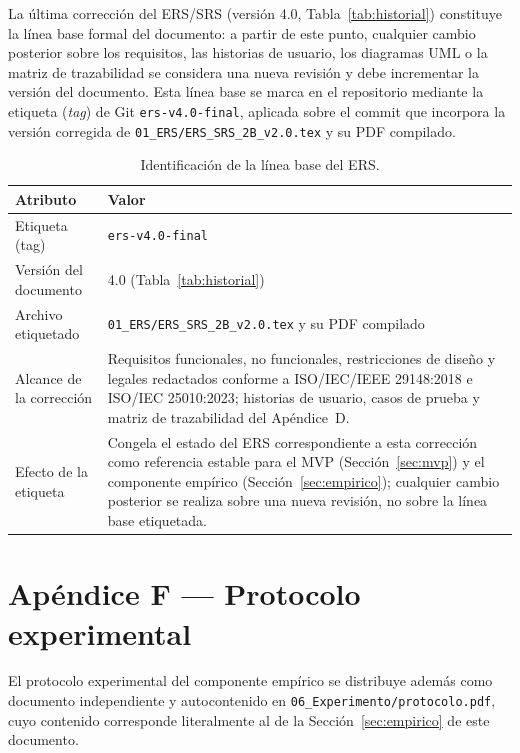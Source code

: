 \documentclass[journal,onecolumn]{IEEEtran}
\begin{document}
	La última corrección del ERS/SRS (versión 4.0, Tabla~\ref{tab:historial})
	constituye la línea base formal del documento: a partir de este punto,
	cualquier cambio posterior sobre los requisitos, las historias de usuario,
	los diagramas UML o la matriz de trazabilidad se considera una nueva
	revisión y debe incrementar la versión del documento. Esta línea base se
	marca en el repositorio mediante la etiqueta (\emph{tag}) de Git
	\texttt{ers-v4.0-final}, aplicada sobre el commit que incorpora la versión
	corregida de \texttt{01\_ERS/ERS\_SRS\_2B\_v2.0.tex} y su PDF compilado.

	\begin{table}[H]
		\centering
		\caption{Identificación de la línea base del ERS.}
		\label{tab:linea-base-ers}
		\small
		\begin{tabularx}{\textwidth}{@{}p{4cm} X@{}}
			\toprule
			\textbf{Atributo} & \textbf{Valor} \\
			\midrule
			Etiqueta (tag) & \texttt{ers-v4.0-final} \\
			Versión del documento & 4.0 (Tabla~\ref{tab:historial}) \\
			Archivo etiquetado & \texttt{01\_ERS/ERS\_SRS\_2B\_v2.0.tex} y su PDF compilado \\
			Alcance de la corrección & Requisitos funcionales, no funcionales, restricciones de diseño y legales redactados conforme a ISO/IEC/IEEE 29148:2018 e ISO/IEC 25010:2023; historias de usuario, casos de prueba y matriz de trazabilidad del Apéndice~D. \\
			Efecto de la etiqueta & Congela el estado del ERS correspondiente a esta corrección como referencia estable para el MVP (Sección~\ref{sec:mvp}) y el componente empírico (Sección~\ref{sec:empirico}); cualquier cambio posterior se realiza sobre una nueva revisión, no sobre la línea base etiquetada. \\
			\bottomrule
		\end{tabularx}
	\end{table}

	\section*{Apéndice F --- Protocolo experimental}
	\label{ap:protocolo}
	
	El protocolo experimental del componente empírico se distribuye además como
	documento independiente y autocontenido en
	\texttt{06\_Experimento/protocolo.pdf}, cuyo contenido corresponde
	literalmente al de la Sección~\ref{sec:empirico} de este documento.
	
\end{document}
